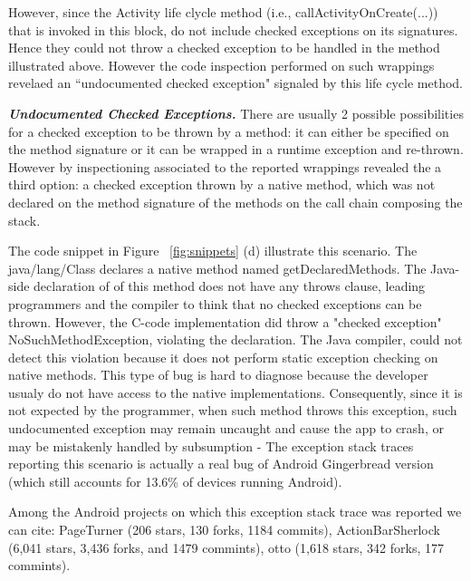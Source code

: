 \documentclass[conference]{IEEEtran}
\begin{document}


However, since the Activity life clycle method (i.e., callActivityOnCreate(...)) that is invoked in this block,
 do not include checked exceptions on its signatures. Hence they could not throw a checked exception to be handled 
in the method illustrated above. However the code inspection performed on such wrappings revelaed an
``undocumented checked exception" signaled by this life cycle method.

\emph{\textbf{Undocumented Checked Exceptions.}} There are usually
2 possible possibilities for a checked exception to be thrown by a method:
it can either be specified on the method signature or it can be wrapped in a 
runtime exception and re-thrown. However by inspectioning associated to the reported wrappings 
revealed the a third option: a checked exception thrown by a native method, which was not declared
on the method signature of the methods on the call chain composing the stack. 

The code snippet in Figure ~\ref{fig:snippets} (d) illustrate this scenario.
 The java/lang/Class declares a native method named getDeclaredMethods. 
The Java-side declaration of of this method does not have any throws clause, 
leading programmers and the compiler to think that no checked exceptions can be thrown.
 However, the C-code implementation did throw a "checked exception" NoSuchMethodException, 
violating the declaration. The Java compiler, could not detect this violation because it does 
not perform static exception checking on native methods. This type of bug is hard to diagnose
because the developer usualy do not have access to the native implementations. 
Consequently, since it is not expected by the programmer, when such method throws 
this exception, such undocumented exception may remain
uncaught and cause the app to crash, or may be mistakenly handled by subsumption - 
The exception stack traces reporting this scenario is actually a real bug of Android 
Gingerbread version (which still accounts for 13.6\% of devices running Android).

Among the Android projects on which this exception stack trace was reported we can cite:
PageTurner (206 stars, 130 forks, 1184 commits), ActionBarSherlock (6,041 stars, 
3,436 forks, and 1479 commints), otto (1,618 stars,	342 forks, 	177 commints).
\end{document}
